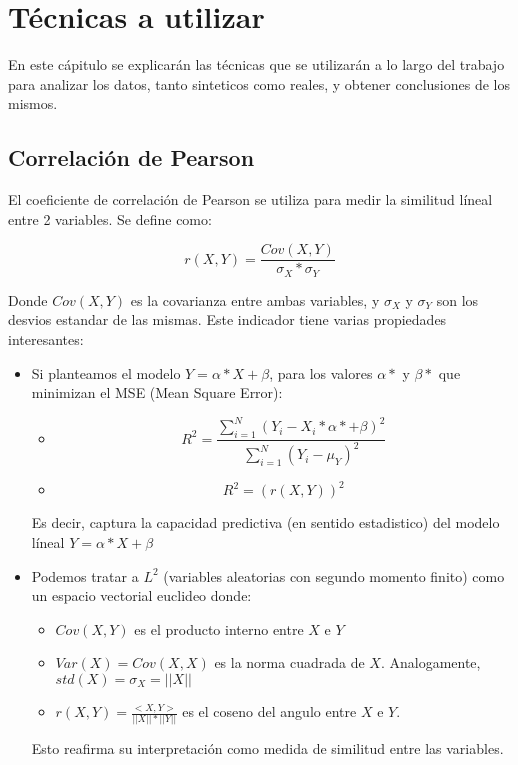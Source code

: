 \chapter{Técnicas a utilizar}

En este cápitulo se explicarán las técnicas que se utilizarán a lo largo del trabajo para analizar los datos, tanto sinteticos como reales, y obtener conclusiones de los mismos.

\section{Correlación de Pearson}

El coeficiente de correlación de Pearson se utiliza para medir la similitud líneal entre 2 variables. Se define como:

$$
    r(X,Y) = \frac{Cov(X,Y)}{\sigma_X * \sigma_Y}
$$

Donde $Cov(X,Y)$ es la covarianza entre ambas variables, y $\sigma_X$ y $\sigma_Y$ son los desvios estandar de las mismas. Este indicador tiene varias propiedades interesantes:

\begin{itemize}
    \item Si planteamos el modelo $Y = \alpha * X + \beta$, para los valores $\alpha*$ y $\beta*$ que minimizan el MSE (Mean Square Error):
        \begin{itemize}
            \item $$ R^2 = \frac{\sum_{i=1}^{N} (Y_i - X_i * \alpha* + \beta)^2} {\sum_{i=1}^{N} (Y_i - \mu_Y)^2} $$
            \item $$ R^2 = (r(X,Y))^2 $$
        \end{itemize}

        Es decir, captura la capacidad predictiva (en sentido estadistico) del modelo líneal $Y = \alpha * X + \beta$
    \item Podemos tratar a $L^2$ (variables aleatorias con segundo momento finito) como un espacio vectorial euclideo donde:
        \begin{itemize}
            \item $Cov(X,Y)$ es el producto interno entre $X$ e $Y$
            \item $Var(X) = Cov(X,X)$ es la norma cuadrada de $X$. Analogamente, $std(X) = \sigma_X = ||X||$
            \item $ r(X,Y) = \frac{<X,Y>}{||X|| * ||Y||} $ es el coseno del angulo entre $X$ e $Y$.
        \end{itemize}

        Esto reafirma su interpretación como medida de similitud entre las variables.
\end{itemize}



